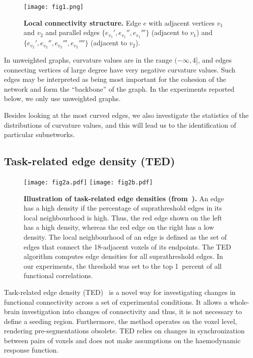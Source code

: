 \documentclass[english,11pt]{article}
\begin{document}
\begin{figure*}[h!]
\begin{center}
\texttt{[image: fig1.png]} 
	\caption{{\bf Local connectivity structure.} Edge $e$ with adjacent vertices $v_1$ and $v_2$
        and parallel edges $\lbrace e_{v_1}', e_{v_1}'', e_{v_1}''' \rbrace$ (adjacent to $v_1$)
        and $\lbrace e_{v_2}', e_{v_2}'', e_{v_2}''', e_{v_2}'''' \rbrace$ (adjacent to $v_2$).}
\end{center}
	\label{fig:FR-sketch}
\end{figure*}

In unweighted graphs, curvature values are in the range $(-\infty,4]$, and 
edges connecting vertices of large degree have very negative curvature values.
Such edges may be interpreted as being most important for the cohesion of the network and form
the ``backbone'' of the graph. In the experiments reported below, we only use unweighted graphs.

Besides looking at the most curved edges, we also investigate the statistics of the distributions of curvature values, and this will lead us to the identification of particular subnetworks.


\subsection{Task-related edge density (TED)}

\begin{figure*}[h!]
\centerline{
\texttt{[image: fig2a.pdf]} \hspace*{0.5cm}
\texttt{[image: fig2b.pdf]}}  
\caption{{\bf Illustration of task-related edge densities (from~\cite{lohmann2016}).}
An edge has a high density if the percentage of suprathreshold edges in its local neighbourhood is high. 
Thus, the red edge shown on the left has a high density, whereas the red edge on the right has a low density.
The local neighbourhood of an edge is defined as the set of edges that connect the 18-adjacent voxels of its endpoints.
The TED algorithm computes edge densities for all suprathreshold edges. In our experiments, the threshold was set
to the top 1~percent of all functional correlations.}
\label{ted}
\end{figure*}


Task-related edge density (TED)~\cite{lohmann2016} is a novel way for investigating changes in
functional connectivity across a set of experimental conditions. It allows a whole-brain investigation
into changes of connectivity and thus, it is not necessary to define a seeding region. Furthermore, the
method operates on the voxel level, rendering pre-segmentations obsolete. TED relies on changes in
synchronization between pairs of voxels and does not make assumptions on the haemodynamic response
function.
\end{document}
